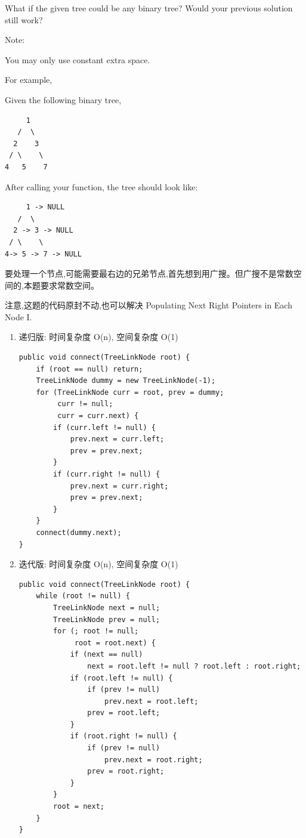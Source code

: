 \documentclass[12pt]{book}
\begin{document}
What if the given tree could be any binary tree? Would your previous solution still work?

Note:

You may only use constant extra space.

For example,

Given the following binary tree,
\lstset{language=java,label= ,caption= ,numbers=none}
\begin{lstlisting}
     1
   /  \
  2    3
 / \    \
4   5    7
\end{lstlisting}

After calling your function, the tree should look like:
\lstset{language=java,label= ,caption= ,numbers=none}
\begin{lstlisting}
     1 -> NULL
   /  \
  2 -> 3 -> NULL
 / \    \
4-> 5 -> 7 -> NULL
\end{lstlisting}

要处理一个节点,可能需要最右边的兄弟节点,首先想到用广搜。但广搜不是常数空间的,本题要求常数空间。

注意,这题的代码原封不动,也可以解决 Populating Next Right Pointers in Each Node I.
\begin{enumerate}
\item 递归版: 时间复杂度 O(n), 空间复杂度 O(1)
\label{sec-4-2-12-1}

\lstset{language=java,label= ,caption= ,numbers=none}
\begin{lstlisting}
public void connect(TreeLinkNode root) {
    if (root == null) return;
    TreeLinkNode dummy = new TreeLinkNode(-1);
    for (TreeLinkNode curr = root, prev = dummy;
         curr != null;
         curr = curr.next) {
        if (curr.left != null) {
            prev.next = curr.left;
            prev = prev.next;
        }
        if (curr.right != null) {
            prev.next = curr.right;
            prev = prev.next;
        }
    }
    connect(dummy.next);
}
\end{lstlisting}

\item 迭代版: 时间复杂度 O(n), 空间复杂度 O(1)
\label{sec-4-2-12-2}

\lstset{language=java,label= ,caption= ,numbers=none}
\begin{lstlisting}
public void connect(TreeLinkNode root) {
    while (root != null) {
        TreeLinkNode next = null;
        TreeLinkNode prev = null;
        for (; root != null;
             root = root.next) {
            if (next == null) 
                next = root.left != null ? root.left : root.right;
            if (root.left != null) {
                if (prev != null)
                    prev.next = root.left;
                prev = root.left;
            }
            if (root.right != null) {
                if (prev != null)
                    prev.next = root.right;
                prev = root.right;
            }
        }
        root = next;
    }
}
\end{lstlisting}
\end{enumerate}
\end{document}

